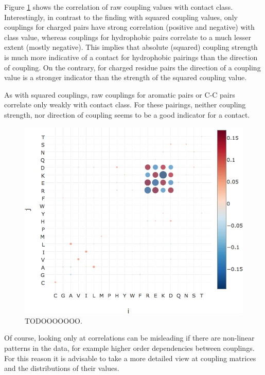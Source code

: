 \documentclass[12pt,a4paper,twoside]{book}
\theoremstyle{definition}
\theoremstyle{definition}
\theoremstyle{remark}
\begin{document}
Figure \ref{fig:coupling-correlation} shows the correlation of raw
coupling values with contact class. Interestingly, in contrast to the
finding with squared coupling values, only couplings for charged pairs
have strong correlation (positive and negative) with class value,
whereas couplings for hydrophobic pairs correlate to a much lesser
extent (mostly negative). This implies that absolute (squared) coupling
strength is much more indicative of a contact for hydrophobic pairings
than the direction of coupling. On the contrary, for charged residue
pairs the direction of a coupling value is a stronger indicator than the
strength of the squared coupling value.

As with squared couplings, raw couplings for aromatic pairs or C-C pairs
correlate only weakly with contact class. For these pairings, neither
coupling strength, nor direction of coupling seems to be a good
indicator for a contact.



\begin{figure}
\includegraphics[width=0.9\linewidth]{img/coupling_matrix_analysis/correlation_couplings_with_contact_class_notitle} \caption{TODOOOOOOO.}\label{fig:coupling-correlation}
\end{figure}

Of course, looking only at correlations can be misleading if there are
non-linear patterns in the data, for example higher order dependencies
between couplings. For this reason it is advisable to take a more
detailed view at coupling matrices and the distributions of their
values.
\end{document}

